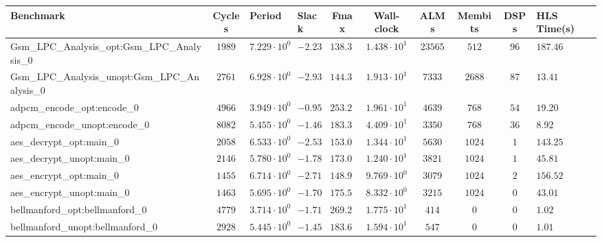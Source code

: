 \begin{tabular}{|l|c|HHc|c|c|c|cH|}
\hline
Benchmark                                       & Cycles       & Period                 & Slack     & Fmax       & Wall-clock              & ALMs       & Membits     & DSPs    & HLS Time(s) \\
\hline
Gsm\_LPC\_Analysis\_opt:Gsm\_LPC\_Analysis\_0   & $ 1989     $ & $ 7.229 \cdot 10^{0} $ & $ -2.23 $ & $ 138.33 $ & $ 1.438 \cdot 10^{1}  $ & $ 23565  $ & $ 512     $ & $ 96  $ & $ 187.46  $ \\
Gsm\_LPC\_Analysis\_unopt:Gsm\_LPC\_Analysis\_0 & $ 2761     $ & $ 6.928 \cdot 10^{0} $ & $ -2.93 $ & $ 144.34 $ & $ 1.913 \cdot 10^{1}  $ & $ 7333   $ & $ 2688    $ & $ 87  $ & $ 13.41   $ \\
adpcm\_encode\_opt:encode\_0                    & $ 4966     $ & $ 3.949 \cdot 10^{0} $ & $ -0.95 $ & $ 253.23 $ & $ 1.961 \cdot 10^{1}  $ & $ 4639   $ & $ 768     $ & $ 54  $ & $ 19.20   $ \\
adpcm\_encode\_unopt:encode\_0                  & $ 8082     $ & $ 5.455 \cdot 10^{0} $ & $ -1.46 $ & $ 183.32 $ & $ 4.409 \cdot 10^{1}  $ & $ 3350   $ & $ 768     $ & $ 36  $ & $ 8.92    $ \\
aes\_decrypt\_opt:main\_0                       & $ 2058     $ & $ 6.533 \cdot 10^{0} $ & $ -2.53 $ & $ 153.07 $ & $ 1.344 \cdot 10^{1}  $ & $ 5630   $ & $ 1024    $ & $ 1   $ & $ 143.25  $ \\
aes\_decrypt\_unopt:main\_0                     & $ 2146     $ & $ 5.780 \cdot 10^{0} $ & $ -1.78 $ & $ 173.01 $ & $ 1.240 \cdot 10^{1}  $ & $ 3821   $ & $ 1024    $ & $ 1   $ & $ 45.81   $ \\
aes\_encrypt\_opt:main\_0                       & $ 1455     $ & $ 6.714 \cdot 10^{0} $ & $ -2.71 $ & $ 148.94 $ & $ 9.769 \cdot 10^{0}  $ & $ 3079   $ & $ 1024    $ & $ 2   $ & $ 156.52  $ \\
aes\_encrypt\_unopt:main\_0                     & $ 1463     $ & $ 5.695 \cdot 10^{0} $ & $ -1.70 $ & $ 175.59 $ & $ 8.332 \cdot 10^{0}  $ & $ 3215   $ & $ 1024    $ & $ 0   $ & $ 43.01   $ \\
bellmanford\_opt:bellmanford\_0                 & $ 4779     $ & $ 3.714 \cdot 10^{0} $ & $ -1.71 $ & $ 269.25 $ & $ 1.775 \cdot 10^{1}  $ & $ 414    $ & $ 0       $ & $ 0   $ & $ 1.02    $ \\
bellmanford\_unopt:bellmanford\_0               & $ 2928     $ & $ 5.445 \cdot 10^{0} $ & $ -1.45 $ & $ 183.65 $ & $ 1.594 \cdot 10^{1}  $ & $ 547    $ & $ 0       $ & $ 0   $ & $ 1.01    $ \\

\end{tabular}
